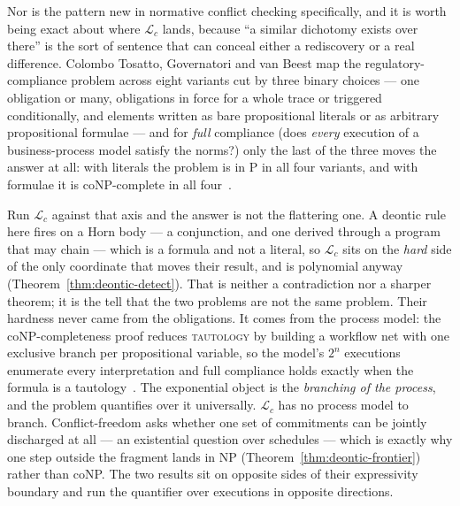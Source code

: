\documentclass[11pt,a4paper]{article}
\theoremstyle{definition}
\theoremstyle{definition}
\theoremstyle{remark}
\begin{document}
\pagebreak[4]
Nor is the pattern new in normative conflict checking specifically, and it is
worth being exact about where $\mathcal{L}_c$ lands, because ``a similar
dichotomy exists over there'' is the sort of sentence that can conceal either a
rediscovery or a real difference. Colombo Tosatto, Governatori and van Beest map
the regulatory-compliance problem across eight variants cut by three binary
choices --- one obligation or many, obligations in force for a whole trace or
triggered conditionally, and elements written as bare propositional literals or
as arbitrary propositional formulae --- and for \emph{full} compliance (does
\emph{every} execution of a business-process model satisfy the norms?) only the
last of the three moves the answer at all: with literals the problem is in P in
all four variants, and with formulae it is coNP-complete in all
four~.

Run $\mathcal{L}_c$ against that axis and the answer is not the flattering one.
A deontic rule here fires on a Horn body --- a conjunction, and one derived
through a program that may chain --- which is a formula and not a literal, so
$\mathcal{L}_c$ sits on the \emph{hard} side of the only coordinate that moves
their result, and is polynomial anyway (Theorem~\ref{thm:deontic-detect}). That
is neither a contradiction nor a sharper theorem; it is the tell that the two
problems are not the same problem. Their hardness never came from the
obligations. It comes from the process model: the coNP-completeness proof
reduces \textsc{tautology} by building a workflow net with one exclusive branch
per propositional variable, so the model's $2^n$ executions enumerate every
interpretation and full compliance holds exactly when the formula is a
tautology~. The exponential object is the \emph{branching of
the process}, and the problem quantifies over it universally. $\mathcal{L}_c$
has no process model to branch. Conflict-freedom asks whether one set of
commitments can be jointly discharged at all --- an existential question over
schedules --- which is exactly why one step outside the fragment lands in NP
(Theorem~\ref{thm:deontic-frontier}) rather than coNP. The two results sit on
opposite sides of their expressivity boundary and run the quantifier over
executions in opposite directions.
\end{document}
